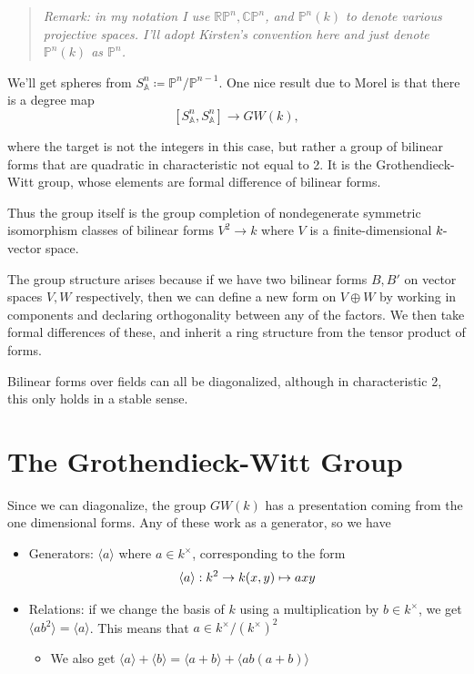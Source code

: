 \documentclass[11pt]{scrreprt}
\theoremstyle{definition}
\providecommand{\tightlist}{%
  \setlength{\itemsep}{0pt}\setlength{\parskip}{0pt}}
\newcommand{\RP}[0]{{\mathbb{RP}}}
\newcommand{\CP}[0]{{\mathbb{CP}}}
\newcommand{\PP}[0]{{\mathbb{P}}}
\newcommand{\Af}[0]{{\mathbb{A}}}
\newcommand{\generators}[1]{\langle{#1}\rangle}
\newcommand{\dash}[0]{{\hbox{-}}}
\newcommand{\definedas}[0]{\coloneqq}
\begin{document}
\begin{quote}\textit{
Remark: in my notation I use \(\RP^n, \CP^n\), and \(\PP^n(k)\) to
denote various projective spaces. I'll adopt Kirsten's convention here
and just denote \(\PP^n(k)\) as \(\PP^n\).
}\end{quote}

We'll get spheres from \(S_\Af^n \definedas \PP^n/\PP^{n-1}\). One nice
result due to Morel is that there is a degree map \[
[S_\Af^n, S_\Af^n] \to GW(k),
\]

where the target is not the integers in this case, but rather a group of
bilinear forms that are quadratic in characteristic not equal to 2. It
is the Grothendieck-Witt group, whose elements are formal difference of
bilinear forms.

Thus the group itself is the group completion of nondegenerate symmetric
isomorphism classes of bilinear forms \(V^2 \to k\) where \(V\) is a
finite-dimensional \(k\dash\)vector space.

The group structure arises because if we have two bilinear forms
\(B, B'\) on vector spaces \(V, W\) respectively, then we can define a
new form on \(V \oplus W\) by working in components and declaring
orthogonality between any of the factors. We then take formal
differences of these, and inherit a ring structure from the tensor
product of forms.

Bilinear forms over fields can all be diagonalized, although in
characteristic 2, this only holds in a stable sense.

\hypertarget{the-grothendieck-witt-group}{%
\section{The Grothendieck-Witt
Group}\label{the-grothendieck-witt-group}}

Since we can diagonalize, the group \(GW(k)\) has a presentation coming
from the one dimensional forms. Any of these work as a generator, so we
have

\begin{itemize}
\tightlist
\item
  Generators: \(\generators{a}\) where \(a\in k^\times\), corresponding to the form
  \[
    \generators{a} : k^2 \to k\\
  (x,y) \mapsto axy
  \]
\item
  Relations: if we change the basis of \(k\) using a multiplication by
  \(b\in k^\times\), we get \(\generators{ab^2}=\generators{a}\). This means that
  \(a \in k^\times/(k^\times)^2\)

  \begin{itemize}
  \tightlist
  \item
    We also get \(\generators{a} + \generators{b} = \generators{a+b} + \generators{ab(a+b)}\)
  \end{itemize}
\end{itemize}
\end{document}
